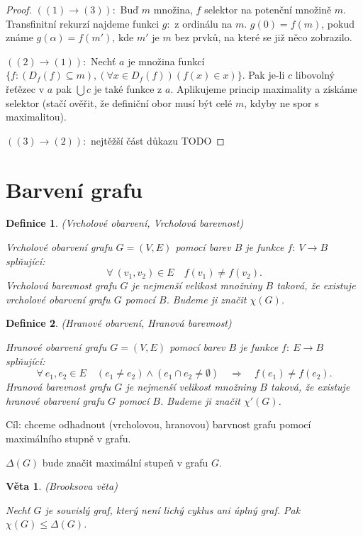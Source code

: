 \documentclass[a4paper,10pt,titlepage]{article} \usepackage[utf8]{inputenc}
\newtheorem{theorem}{Věta}
\newtheorem{define}{Definice}
\begin{document}
\begin{proof}
$((1)\rightarrow(3)):$ Buď $m$ množina, $f$ selektor na potenční množině $m$.
Transfinitní rekurzí najdeme funkci $g:$ z ordinálu na $m$.
$g(0) = f(m)$, pokud známe $g(\alpha) = f(m')$, kde $m'$ je $m$ bez prvků, na které se již něco zobrazilo. 

$((2)\rightarrow(1)):$ Nechť $a$ je množina funkcí $\{f: (D_f(f) \subseteq m),(\forall x \in  D_f(f))(f(x) \in x)\}$.
Pak je-li $c$ libovolný řeťězec v $a$ pak $\bigcup c$ je také funkce z $a$. Aplikujeme princip maximality a získáme selektor
(stačí ověřit, že definiční obor musí být celé $m$, kdyby ne spor s maximalitou).

$((3)\rightarrow(2)):$ nejtěžší část důkazu TODO
\end{proof}

\section{Barvení grafu}
\begin{define}
(Vrcholové obarvení, Vrcholová barevnost)

Vrcholové obarvení grafu $G=(V,E)$ pomocí barev $B$ je funkce $f:\ V \rightarrow B$ splňující:
\[
	\forall\ (v_1,v_2) \in E \quad f(v_1) \neq f(v_2).
\]
Vrcholová barevnost grafu $G$ je nejmenší velikost množniny $B$ taková, že existuje vrcholové obarvení grafu $G$ pomocí $B$.
Budeme ji značit $\chi(G)$.
\end{define}

\begin{define}
(Hranové obarvení, Hranová barevnost)

Hranové obarvení grafu $G=(V,E)$ pomocí barev $B$ je funkce $f:\ E \rightarrow B$ splňující:
\[
	\forall\ e_1,e_2 \in E \quad (e_1 \neq e_2)\wedge (e_1 \cap e_2 \neq \emptyset) \quad \Rightarrow \quad f(e_1) \neq f(e_2).
\]
Hranová barevnost grafu $G$ je nejmenší velikost množniny $B$ taková, že existuje hranové obarvení grafu $G$ pomocí $B$.
Budeme ji značit $\chi'(G)$.
\end{define}

Cíl: chceme odhadnout (vrcholovou, hranovou) barvnost grafu pomocí
maximálního stupně v grafu.

$\Delta(G)$ bude značit maximální stupeň v grafu $G$.

\begin{theorem}
(Brooksova věta)

Nechť $G$ je souvislý graf, který není lichý cyklus ani úplný graf.
Pak $\chi(G) \leq \Delta(G)$.
\end{theorem}
\end{document}
